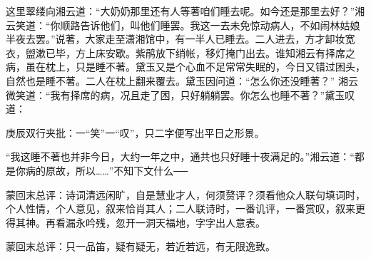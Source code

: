 \begin{parag}


    这里翠缕向湘云道：“大奶奶那里还有人等著咱们睡去呢。如今还是那里去好？”湘云笑道：“你顺路告诉他们，叫他们睡罢。我这一去未免惊动病人，不如闹林姑娘半夜去罢。”说著，大家走至潇湘馆中，有一半人已睡去。二人进去，方才卸妆宽衣，盥漱已毕，方上床安歇。紫鹃放下绡帐，移灯掩门出去。谁知湘云有择席之病，虽在枕上，只是睡不著。黛玉又是个心血不足常常失眠的，今日又错过困头，自然也是睡不著。二人在枕上翻来覆去。黛玉因问道：“怎么你还没睡著？” 湘云微笑道：“我有择席的病，况且走了困，只好躺躺罢。你怎么也睡不著？”黛玉叹道：\begin{note}庚辰双行夹批：一“笑”一“叹”，只二字便写出平日之形景。\end{note}“我这睡不著也并非今日，大约一年之中，通共也只好睡十夜满足的。”湘云道：“都是你病的原故，所以……”不知下文什么──
\end{parag}

\begin{parag}

    \begin{note}蒙回末总评：诗词清远闲旷，自是慧业才人，何须赘评？须看他众人联句填词时，个人性情，个人意见，叙来恰肖其人；二人联诗时，一番讥评，一番赏叹，叙来更得其神。再看漏永吟残，忽开一洞天福地，字字出人意表。\end{note}
\end{parag}


\begin{parag}


    \begin{note}蒙回末总评：只一品笛，疑有疑无，若近若远，有无限逸致。\end{note}
\end{parag}